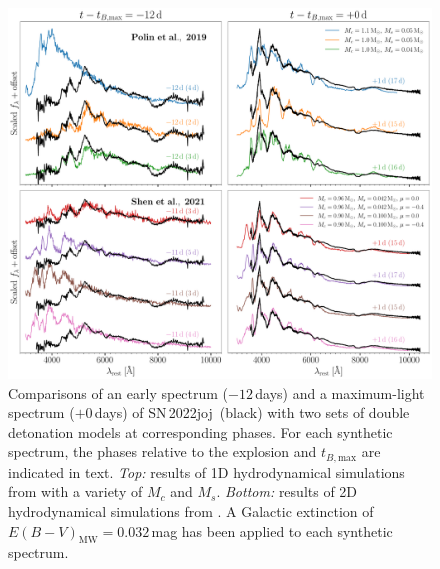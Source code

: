 \documentclass[twocolumn]{aastex631}
\newcommand{\sn}{SN\,2022joj}
\begin{document}
\begin{CJK*}{UTF8}{gbsn}
\begin{figure}
    \centering
    \includegraphics[width=\linewidth]{model_comparison_spec.pdf}
    \caption{Comparisons of an early spectrum ($-12$\,days) and a maximum-light spectrum ($+0$\,days) of \sn\ (black) with two sets of double detonation models at corresponding phases. For each synthetic spectrum, the phases relative to the explosion and $t_{B,\mathrm{max}}$ are indicated in text. \textit{Top:} results of 1D hydrodynamical simulations from \citet{polin_observational_2019} with a variety of $M_c$ and $M_s$. \textit{Bottom:} results of 2D hydrodynamical simulations from \citep{Shen_2D_2021}. A Galactic extinction of ${E(B-V)_\mathrm{MW}}=0.032$\,mag has been applied to each synthetic spectrum.}
    \label{fig:model_spec}
\end{figure}


\end{CJK*}
\end{document}
